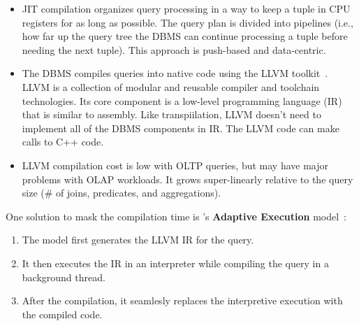 \documentclass[11pt]{article}
\begin{document}
\begin{itemize}
    \item
    JIT compilation organizes query processing in a way to keep a tuple in CPU registers for as long 
    as possible. The query plan is divided into pipelines (i.e., how far up the query tree 
    the DBMS can continue processing a tuple before needing the next tuple). This approach is 
    push-based and data-centric.

    \item
    The  DBMS compiles queries into native code using the LLVM 
    toolkit~\cite{lattner2004}. LLVM is a collection of modular and reusable compiler and toolchain 
    technologies. Its core component is a low-level programming language (IR) that is similar to 
    assembly.
    Like transpiilation, LLVM doesn't need to implement all of the DBMS components in IR. The LLVM 
    code can make calls to C++ code.
    

    \item
    LLVM compilation cost is low with OLTP queries, but may have major problems with OLAP workloads. 
    It grows super-linearly relative to the query size (\# of joins, predicates, and aggregations).

\end{itemize}
        
One solution to mask the compilation time is 's \textbf{Adaptive Execution} 
model~\cite{kohn2018}:
\begin{enumerate}
    \item
    The model first generates the LLVM IR for the query.
    
    \item
    It then executes the IR in an interpreter while compiling the query in a background thread.
    
    \item
    After the compilation, it seamlesly replaces the interpretive execution with the compiled code.
\end{enumerate}

\end{document}
